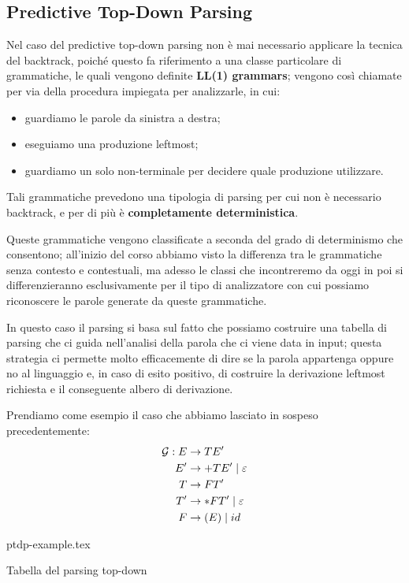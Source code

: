 \documentclass[class=book, crop=false, oneside, 12pt]{standalone}
\begin{document}
\subsection{Predictive Top-Down Parsing}
Nel caso del predictive top-down parsing non è mai necessario applicare la tecnica del backtrack, poiché questo fa riferimento a una classe particolare di grammatiche, le quali vengono definite \textbf{LL(1) grammars}; vengono così chiamate per via della procedura impiegata per analizzarle, in cui:
\begin{itemize}
    \item guardiamo le parole da sinistra a destra;
    \item eseguiamo una produzione leftmost;
    \item guardiamo un solo non-terminale per decidere quale produzione utilizzare.
\end{itemize}
Tali grammatiche prevedono una tipologia di parsing per cui non è necessario backtrack, e per di più è \textbf{completamente deterministica}.

Queste grammatiche vengono classificate a seconda del grado di determinismo che consentono; all'inizio del corso abbiamo visto la differenza tra le grammatiche senza contesto e contestuali, ma adesso le classi che incontreremo da oggi in poi si differenzieranno esclusivamente per il tipo di analizzatore con cui possiamo riconoscere le parole generate da queste grammatiche. 

In questo caso il parsing si basa sul fatto che possiamo costruire una tabella di parsing che ci guida nell'analisi della parola che ci viene data in input; questa strategia ci permette molto efficacemente di dire se la parola appartenga oppure no al linguaggio e, in caso di esito positivo, di costruire la derivazione leftmost richiesta e il conseguente albero di derivazione.

Prendiamo come esempio il caso che abbiamo lasciato in sospeso precedentemente:
\begin{align*}
    \mathcal{G}: E &\rightarrow TE' \\
    E' &\rightarrow +TE' \mid \varepsilon \\
    T &\rightarrow FT' \\
    T' &\rightarrow *FT' \mid \varepsilon \\
    F &\rightarrow (E) \mid id
\end{align*}
\begin{table}[H]
	\centering
	{ptdp-example.tex}
    \caption{Tabella del parsing top-down}
    \label{ptdp-example}
\end{table} 
\end{document}
